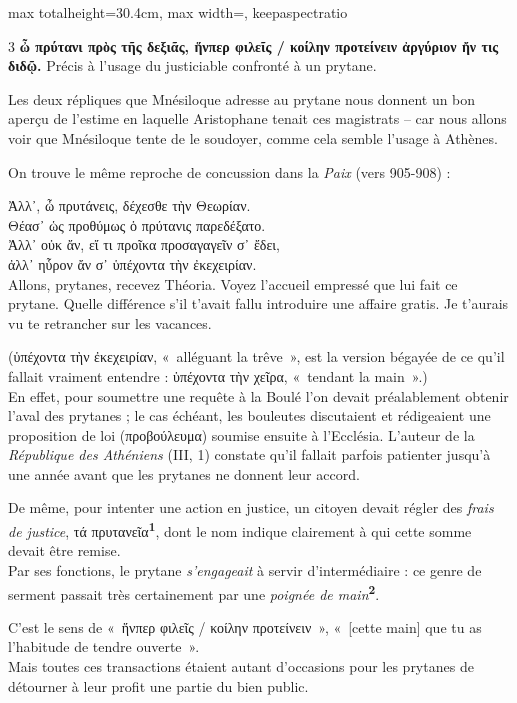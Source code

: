 \documentclass[11pt,twoside]{book}
\newcommand{\italique}[1]{\textit{#1}}
\newcommand{\citComm}[1]{\begin{quoting}[vskip=0.4pt,leftmargin=0.7em,rightmargin=0.2em]#1\end{quoting}}
\newcommand{\marqueur}[1]{\textsuperscript{\color{rubricRed}\textbf{#1}}}
\begin{document}
\begin{adjustbox}{max totalheight=30.4cm, max width=\textwidth, keepaspectratio}
\begin{minipage}{\textwidth}
{\begin{multicols}{3}
 \textbf{ὦ πρύτανι πρὸς τῆς δεξιᾶς, ἥνπερ φιλεῖς / κοίλην προτείνειν ἀργύριον ἤν τις διδῷ.} Précis à l'usage du justiciable confronté à un prytane.
\par\vspace{1.5pt}
\noindent Les deux répliques que Mnésiloque adresse au prytane nous donnent un bon aperçu de l'estime en laquelle Aristophane tenait ces magistrats -- car nous allons voir que Mnésiloque tente de le soudoyer, comme cela semble l'usage à Athènes.
\par\vspace{1.5pt}
\noindent On trouve le même reproche de concussion dans la \italique{Paix} (vers 905-908) :
\citComm{Ἀλλ᾽, ὦ πρυτάνεις, δέχεσθε τὴν Θεωρίαν.\\
Θέασ᾽ ὡς προθύμως ὁ πρύτανις παρεδέξατο.\\
Ἀλλ᾽ οὐκ ἄν, εἴ τι προῖκα προσαγαγεῖν σ᾽ ἔδει,\\
ἀλλ᾽ ηὗρον ἄν σ᾽ ὑπέχοντα τὴν ἐκεχειρίαν.\\
Allons, prytanes, recevez Théoria. Voyez l'accueil empressé que lui fait ce prytane. Quelle différence s'il t'avait fallu introduire une affaire gratis. Je t'aurais vu te retrancher sur les vacances.}
\par\vspace{1.5pt}
\noindent (ὑπέχοντα τὴν ἐκεχειρίαν, «~alléguant la trêve~», est la version bégayée de ce qu'il fallait vraiment entendre : ὑπέχοντα τὴν χεῖρα, «~tendant la main~».)\\ En effet, pour soumettre une requête à la Boulé l'on devait préalablement obtenir l'aval des prytanes ; le cas échéant, les bouleutes discutaient et rédigeaient une proposition de loi (προβούλευμα) soumise ensuite à l'Ecclésia. L'auteur de la \italique{République des Athéniens} (III, 1) constate qu'il fallait parfois patienter jusqu'à une année avant que les prytanes ne donnent leur accord.
\par\vspace{1.5pt}
\noindent De même, pour intenter une action en justice, un citoyen devait régler des \italique{frais de justice}, τά πρυτανεῖα\marqueur{1}, dont le nom indique clairement à qui cette somme devait être remise.\\  Par ses fonctions, le prytane \italique{s'engageait} à servir d'intermédiaire : ce genre de serment passait très certainement par une \italique{poignée de main}\marqueur{2}.
\par\vspace{1.5pt}
\noindent C'est le sens de «~ἥνπερ φιλεῖς / κοίλην προτείνειν~», «~[cette main] que tu as l'habitude de tendre ouverte~».\\ Mais toutes ces transactions étaient autant d'occasions pour les prytanes de détourner à leur profit une partie du bien public.

\end{multicols}}
\end{minipage}
\end{adjustbox}
\end{document}
